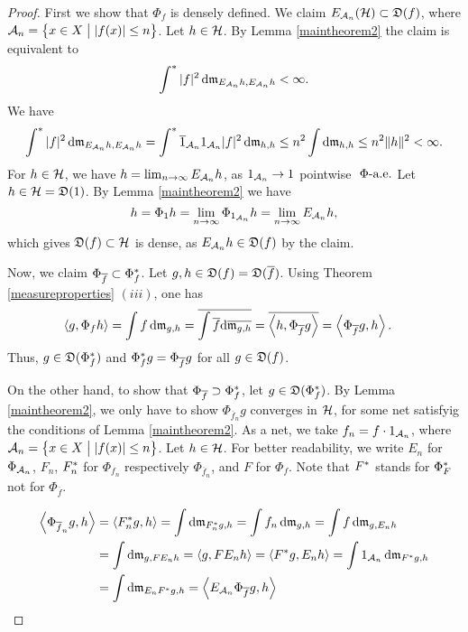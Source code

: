\begin{proof}

First we show that $\Phi_f$ is densely defined. 
We claim $E_{\mathcal{A}_n}(\mathcal{H}) \subset \mathfrak{D}(f)$, where $\mathcal{A}_n = 
\left\lbrace x \in X \bigm | | f(x) | \leq n \right\rbrace$.
Let $h \in \mathcal{H}$. By Lemma \ref{maintheorem2} the claim is
equivalent to 
\[
\int ^{*} |f|^2 \operatorname{d}\! \mathfrak{m}_{E_{\mathcal{A}_n}h, E_{\mathcal{A}_n}h} < \infty.
\]
We have 
\begin{align*}
  \int ^{*} |f|^2 \operatorname{d}\! \mathfrak{m}_{E_{\mathcal{A}_n}h, E_{\mathcal{A}_n}h} = 
  \int ^{*} \overline{1}_{\mathcal{A}_n} 1_{\mathcal{A}_n} |f|^2 \operatorname{d}\! \mathfrak{m}_{h,h} \leq
  n^2 \int \operatorname{d}\! \mathfrak{m}_{h,h} \leq n^2 \| h\|^2 < \infty.
\end{align*}
For $h \in \mathcal{H}$, we have $h = \lim_{n \to \infty} E_{\mathcal{A}_n} h$,
as $1_{\mathcal{A}_n} \to 1 $ pointwise $~\Phi\text{-a.e.}$
Let $h \in \mathcal{H} = \mathfrak{D}(1)$. By Lemma \ref{maintheorem2} we have
\[
h = \Phi_1 h = \lim_{n \to \infty} \Phi_{1_{\mathcal{A}_n}}h =
\lim_{n \to \infty} E_{\mathcal{A}_n} h , 
\]
which gives $\mathfrak{D}(f) \subset \mathcal{H}$ is dense, as $E_{\mathcal{A}_n} h \in \mathfrak{D}(f)$ by
the claim. 

Now, we claim $ \Phi_{\overline{f}} \subset \Phi_f ^{*}$.
Let  $g,h \in \mathfrak{D}(f) = \mathfrak{D}(\overline{f})$. Using Theorem \ref{measureproperties} $
(iii)$, one has
\begin{align*}
  \left\langle g, \Phi_f h \right\rangle &= \int f \operatorname{d}\! \mathfrak{m}_{g,h} 
  = \overline{ \int \overline{f} \text{d}\overline{\mathfrak{m}_{g,h}}} 
  = \overline{ \left\langle h , \Phi_{\overline{f}} g  \right\rangle} 
  = \left\langle \Phi_{\overline{f} }g , h \right\rangle.
\end{align*}
Thus, $g \in \mathfrak{D}(\Phi_f ^{*})$ and $\Phi_f ^{*} g = \Phi_{\overline{f}} g$
for all $g \in \mathfrak{D}(f)$.

On the other hand, to show that  $\Phi_{\overline{f}} \supset \Phi_f ^{*}$,
let $g\in \mathfrak{D}(\Phi_f ^{*})$.
By Lemma \ref{maintheorem2}, we only have to show $\Phi_{\overline{f}_n}g$
converges in $\mathcal{H}$, for some net satisfyig the conditions of Lemma
\ref{maintheorem2}. As a net, we take $f_n = f \cdot 1_{\mathcal{A}_n}$,
where $\mathcal{A}_n = \left\lbrace x \in X \bigm | | f(x) | \leq n \right\rbrace$.
Let $h \in \mathcal{H}$. For better readability, we write $E_n$ for 
$\Phi_{\mathcal{A}_n}$, $F_n$, $F_n^{*}$ for $\Phi_{f_n}$ 
respectively $\Phi_{\overline{f}_n}$, and 
$F$ for $\Phi_f$. Note that $F^{*}$ stands for $\Phi_F ^{*}$ not for 
$\Phi_{\overline{f}}$.

\begin{align*}
  \left\langle \Phi_{\overline{f}_n}g,h \right\rangle&=\left\langle  F_n^{*} g, h  \right\rangle = \int \operatorname{d}\! \mathfrak{m}_{F_n^{*} g, h}
= \int f_n \operatorname{d}\! \mathfrak{m}_{g,h} 
= \int f \operatorname{d}\! \mathfrak{m}_{g, E_{n} h }\\
&= \int \operatorname{d}\! \mathfrak{m}_{g, F E_{n} h} 
= \left\langle g, F E_{n} h \right\rangle 
= \left\langle F ^{*} g, E_{n} h \right\rangle
= \int 1_{\mathcal{A}_n} \operatorname{d}\! \mathfrak{m}_{F ^{*} g, h}\\
&= \int \operatorname{d}\! \mathfrak{m}_{E_{n} F ^{*} g, h} 
= \left\langle E_{\mathcal{A}_n}  \Phi_{\overline{f}} g, h \right\rangle
\end{align*}


\end{proof}
